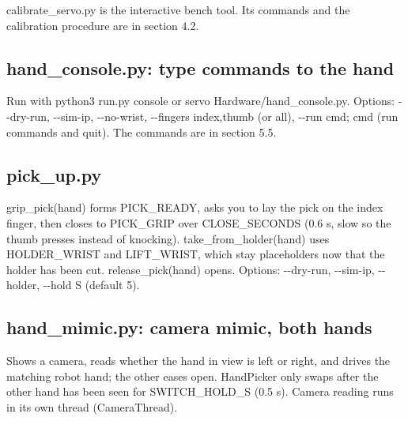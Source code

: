 \documentclass[11pt,letterpaper]{article}
\newcommand{\code}[1]{\textcolor{codeblue}{\ttfamily\smaller\relax #1}}
\begin{document}
\code{calibrate\_\allowbreak{}servo.py} is the interactive bench tool. Its commands and the calibration procedure are in section 4.2.


\subsection{hand\_console.py: type commands to the hand}
Run with \code{python3 run.py console} or \code{servo Hardware/\allowbreak{}hand\_\allowbreak{}console.py}. Options: \code{-{}-{}dry-{}\allowbreak{}run}, \code{-{}-{}sim-{}\allowbreak{}ip}, \code{-{}-{}no-{}\allowbreak{}wrist}, \code{-{}-{}fingers index,\allowbreak{}thumb} (or \code{all}), \code{-{}-{}run \textquotedbl{}cmd; cmd\textquotedbl{}} (run commands and quit). The commands are in section 5.5.


\subsection{pick\_up.py}
\code{grip\_\allowbreak{}pick(hand)} forms \code{PICK\_\allowbreak{}READY}, asks you to lay the pick on the index finger, then closes to \code{PICK\_\allowbreak{}GRIP} over \code{CLOSE\_\allowbreak{}SECONDS} (0.6 s, slow so the thumb presses instead of knocking). \code{take\_\allowbreak{}from\_\allowbreak{}holder(hand)} uses \code{HOLDER\_\allowbreak{}WRIST} and \code{LIFT\_\allowbreak{}WRIST}, which stay placeholders now that the holder has been cut. \code{release\_\allowbreak{}pick(hand)} opens. Options: \code{-{}-{}dry-{}\allowbreak{}run}, \code{-{}-{}sim-{}\allowbreak{}ip}, \code{-{}-{}holder}, \code{-{}-{}hold S} (default 5).


\subsection{hand\_mimic.py: camera mimic, both hands}
Shows a camera, reads whether the hand in view is left or right, and drives the matching robot hand; the other eases open. \code{HandPicker} only swaps after the other hand has been seen for \code{SWITCH\_\allowbreak{}HOLD\_\allowbreak{}S} (0.5 s). Camera reading runs in its own thread (\code{CameraThread}).
\end{document}
